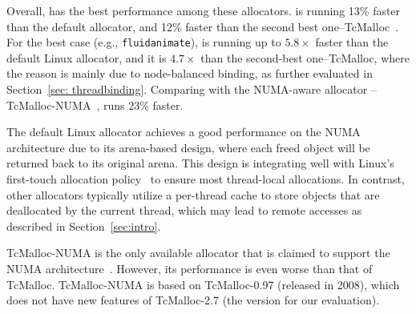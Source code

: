 Overall, \NM{} has the best performance among these allocators. \NM{} is running 13\% faster than the default allocator, and 12\% faster than the second best one--TcMalloc~\cite{tcmalloc}. For the best case (e.g., \texttt{fluidanimate}), \NM{} is running up to $5.8\times$ faster than the default Linux allocator, and it is $4.7\times$ than the second-best one--TcMalloc, where the reason is mainly due to node-balanced binding, as further evaluated in Section~\ref{sec: threadbinding}.  Comparing with the NUMA-aware allocator -- TcMalloc-NUMA~\cite{tcmallocnew}, \NM{} runs 23\% faster.

The default Linux allocator achieves a good performance on the NUMA architecture due to its arena-based design, where each freed object will be returned back to its original arena.
This design is integrating well with Linux's first-touch allocation policy~\cite{Lameter:2013:NO:2508834.2513149} to ensure most thread-local allocations. 
In contrast, other allocators typically utilize a per-thread cache to store objects that are deallocated by the current thread, which may lead to remote accesses as described in Section~\ref{sec:intro}. 

 TcMalloc-NUMA is the only available allocator that is claimed to support the NUMA architecture~\cite{tcmallocnew}. However, its performance is even worse than that of TcMalloc. TcMalloc-NUMA is based on TcMalloc-0.97 (released in 2008), which does not have new features of TcMalloc-2.7 (the version for our evaluation). 
  


